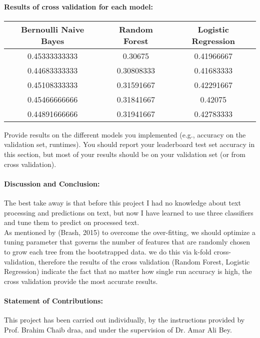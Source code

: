 \documentclass[12pt]{report}
\begin{document}
	\paragraph{Results of cross validation for each model:}
	\begin{center}
		\begin{tabular}{||c c c||} 
			\hline
			Bernoulli Naive Bayes & Random Forest & Logistic Regression\\ [0.5ex] 
			\hline\hline
			0.45333333333 & 0.30675 & 0.41966667\\ 
			\hline
			0.44683333333 & 0.30808333 & 0.41683333\\
			\hline
			0.45108333333 & 0.31591667 & 0.42291667\\
			\hline
			0.45466666666 & 0.31841667& 0.42075   \\
			\hline
			0.44891666666 & 0.31941667 & 0.42783333\\ [1ex] 
			\hline
		\end{tabular}
	\end{center}
	
	
	
	Provide results on the different
	models you implemented (e.g., accuracy on the validation set, runtimes). You should report your
	leaderboard test set accuracy in this section, but most of your results should be on your validation
	set (or from cross validation).
	

	\paragraph{Discussion and Conclusion:}
	The best take away is that before this project I had no knowledge about text processing and predictions on text, but now I have learned to use three classifiers and tune them to predict on processed text. \\
	As mentioned by (Brash, 2015) to overcome the over-fitting, we should optimize a tuning parameter that governs the number of features that are randomly chosen to grow each tree from the bootstrapped data. we do this via k-fold cross-validation, therefore the results of the cross validation (Random Forest, Logistic Regression) indicate the fact that no matter how single run accuracy is high, the cross validation provide the most accurate results.\\
		
	
	\paragraph{Statement of Contributions:}
	This project has been carried out individually, by the instructions provided by Prof. Brahim Chaib draa, and under the supervision of Dr. Amar Ali Bey.\\
	
\end{document}
